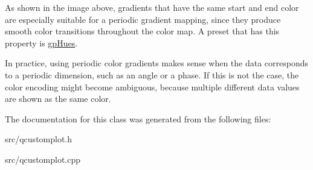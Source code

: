 As shown in the image above, gradients that have the same start and end color are especially suitable for a periodic gradient mapping, since they produce smooth color transitions throughout the color map. A preset that has this property is \hyperlink{classQCPColorGradient_aed6569828fee337023670272910c9072a30efe58407acfb67939032f70213a130}{gp\+Hues}.

In practice, using periodic color gradients makes sense when the data corresponds to a periodic dimension, such as an angle or a phase. If this is not the case, the color encoding might become ambiguous, because multiple different data values are shown as the same color. 

The documentation for this class was generated from the following files\+:\begin{DoxyCompactItemize}
\item 
src/qcustomplot.\+h\item 
src/qcustomplot.\+cpp\end{DoxyCompactItemize}
